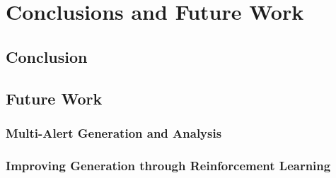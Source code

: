 %
%
%

\chapter{Conclusions and Future Work}

\section{Conclusion}

\section{Future Work}

\subsection{Multi-Alert Generation and Analysis}

\subsection{Improving Generation through Reinforcement Learning}
